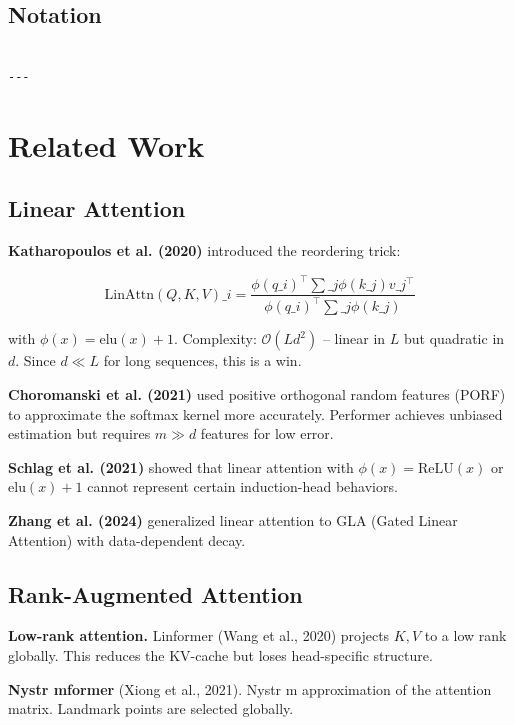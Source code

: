 \subsection{Notation}

\begin{lstlisting}

---
\end{lstlisting}


\section{Related Work}

\subsection{Linear Attention}

\textbf{Katharopoulos et al. (2020)} introduced the reordering trick:

\[
\text{LinAttn}(Q, K, V)\_i = \frac{\phi(q\_i)^\top \sum\_j \phi(k\_j) v\_j^\top}{\phi(q\_i)^\top \sum\_j \phi(k\_j)}
\tag{2.1}
\]

with $\phi(x) = \mathrm{elu}(x) + 1$. Complexity: $\mathcal{O}(L d^2)$ -- 
linear in $L$ but quadratic in $d$. Since $d \ll L$ for long sequences, 
this is a win.

\textbf{Choromanski et al. (2021)} used positive orthogonal random features 
(PORF) to approximate the softmax kernel more accurately. Performer achieves 
unbiased estimation but requires $m \gg d$ features for low error.

\textbf{Schlag et al. (2021)} showed that linear attention with $\phi(x) = 
\mathrm{ReLU}(x)$ or $\mathrm{elu}(x) + 1$ cannot represent certain 
induction-head behaviors.

\textbf{Zhang et al. (2024)} generalized linear attention to GLA (Gated Linear 
Attention) with data-dependent decay.

\subsection{Rank-Augmented Attention}

\textbf{Low-rank attention.} Linformer (Wang et al., 2020) projects $K, V$ to a 
low rank globally. This reduces the KV-cache but loses head-specific 
structure.

\textbf{Nystr mformer} (Xiong et al., 2021). Nystr m approximation of the attention 
matrix. Landmark points are selected globally.

